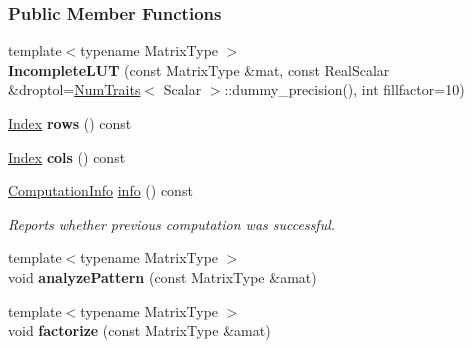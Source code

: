 \subsubsection*{Public Member Functions}
\begin{DoxyCompactItemize}
\item 
\mbox{\label{group___iterative_linear_solvers___module_a366a154352cb8cc486113238015f9ba2}} 
{\footnotesize template$<$typename Matrix\+Type $>$ }\\{\bfseries Incomplete\+L\+UT} (const Matrix\+Type \&mat, const Real\+Scalar \&droptol=\hyperlink{group___core___module_struct_eigen_1_1_num_traits}{Num\+Traits}$<$ Scalar $>$\+::dummy\+\_\+precision(), int fillfactor=10)
\item 
\mbox{\label{group___iterative_linear_solvers___module_abb76af447c1c8b2baad1241740d300e6}} 
\hyperlink{namespace_eigen_a62e77e0933482dafde8fe197d9a2cfde}{Index} {\bfseries rows} () const
\item 
\mbox{\label{group___iterative_linear_solvers___module_a5b1b721e5fe535c9cacbc3245243f4ec}} 
\hyperlink{namespace_eigen_a62e77e0933482dafde8fe197d9a2cfde}{Index} {\bfseries cols} () const
\item 
\hyperlink{group__enums_ga85fad7b87587764e5cf6b513a9e0ee5e}{Computation\+Info} \hyperlink{group___iterative_linear_solvers___module_a941c7d34f15d7bc287e780636be0ee2b}{info} () const
\begin{DoxyCompactList}\small\item\em Reports whether previous computation was successful. \end{DoxyCompactList}\item 
\mbox{\label{group___iterative_linear_solvers___module_ae732858eb360316a1573f91eaba8855f}} 
{\footnotesize template$<$typename Matrix\+Type $>$ }\\void {\bfseries analyze\+Pattern} (const Matrix\+Type \&amat)
\item 
\mbox{\label{group___iterative_linear_solvers___module_a2bd72541bcaeb2dee2540b911c151f41}} 
{\footnotesize template$<$typename Matrix\+Type $>$ }\\void {\bfseries factorize} (const Matrix\+Type \&amat)

\end{DoxyCompactItemize}
